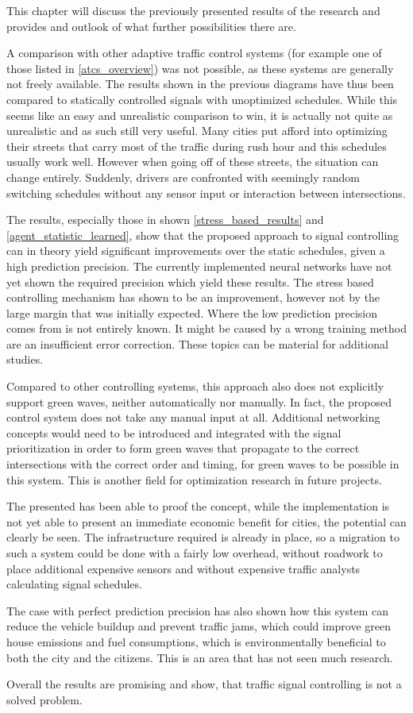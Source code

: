 This chapter will discuss the previously presented results of the research and provides and outlook of what further possibilities there are.

A comparison with other adaptive traffic control systems (for example one of those listed in \autoref{atcs_overview}) was not possible, as these systems are generally not freely available. The results shown in the previous diagrams have thus been compared to statically controlled signals with unoptimized schedules. While this seems like an easy and unrealistic comparison to win, it is actually not quite as unrealistic and as such still very useful. Many cities put afford into optimizing their streets  that carry most of the traffic during rush hour and this schedules usually work well. However when going off of these streets, the situation can change entirely. Suddenly, drivers are confronted with seemingly random switching schedules without any sensor input or interaction between intersections.

The results, especially those in shown \autoref{stress_based_results} and \autoref{agent_statistic_learned}, show that the proposed approach to signal controlling can in theory yield significant improvements over the static schedules, given a high prediction precision. The currently implemented neural networks have not yet shown the required precision which yield these results. The stress based controlling mechanism has shown to be an improvement, however not by the large margin that was initially expected. Where the low prediction precision comes from is not entirely known. It might be caused by a wrong training method are an insufficient error correction. These topics can be material for additional studies.

Compared to other controlling systems, this approach also does not explicitly support green waves, neither automatically nor manually. In fact, the proposed control system does not take any manual input at all. Additional networking concepts would need to be introduced and integrated with the signal prioritization in order to form green waves that propagate to the correct intersections with the correct order and timing, for green waves to be possible in this system. This is another field for optimization research in future projects.

The presented has been able to proof the concept, while the implementation is not yet able to present an immediate economic benefit for cities, the potential can clearly be seen. The infrastructure required is already in place, so a migration to such a system could be done with a fairly low overhead, without roadwork to place additional expensive sensors and without expensive traffic analysts calculating signal schedules.

The case with perfect prediction precision has also shown how this system can reduce the vehicle buildup and prevent traffic jams, which could improve green house emissions and fuel consumptions, which is environmentally beneficial to both the city and the citizens. This is an area that has not seen much research.

Overall the results are promising and show, that traffic signal controlling is not a solved problem.
